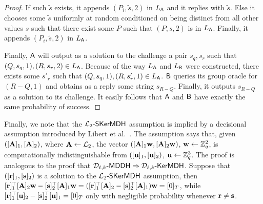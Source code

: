 \begin{proof}
If such $\tilde{s}$ exists, it appends $(P_i, \tilde{s},2)$ in $L_{\mathsf{A}}$ and it replies with $\tilde{s}$.  Else it chooses some $\tilde{s}$ uniformly at random conditioned on being distinct from all other values $s$ such that there exist some $P$ such that $(P,s,2)$ is in $L_{\mathsf{A}}$. Finally, it appends  $(P_i, \tilde{s},2)$ in $L_{\mathsf{A}}$.  


Finally, $\mathsf{A}$ will output as a solution to the challenge a pair $s_q,s_r$ such that 
$(Q,s_q,1),(R,s_r,2) \in L_{\mathsf{A}}$. Because of the way $L_{\mathsf{A}}$ and $L_{\mathsf{B}}$ were constructed,  there exists some $s'_r$ such that $(Q,s_q,1),(R,s'_r,1) \in L_{\mathsf{A}}$. $\mathsf{B}$ queries its group oracle for $(R-Q,1)$ and obtains as a reply some string $s_{R-Q}$. Finally, it outputs $s_{R-Q}$ as a solution to its challenge. 
It easily follows that $\mathsf{A}$ and $\mathsf{B}$ have exactly the same probability of success.
\end{proof} 

Finally, we note that the $\mathcal{L}_{2}\mbox{-}\mathsf{SKerMDH}$ assumption is implied by a decisional assumption introduced by Libert et al.~\cite{EPRINT:LPJY15}. The assumption says that, given $([\mathbf{{A}}]_1,[\mathbf{{A}}]_2)$, where $\mathbf{{A}}\gets\mathcal{L}_2$, the vector $([\mathbf{{A}}]_1\mathbf{w},[\mathbf{{A}}]_2\mathbf{w})$, $\mathbf{w}\gets\mathbb{Z}_q^2$, is computationally indistinguishable from $([\mathbf{u}]_1,[\mathbf{u}]_2)$, $\mathbf{u}\gets\mathbb{Z}_q^3$. The proof is analogous to the proof that $\mathcal{D}_{\ell,k}\mbox{-}\mathsf{MDDH}\Rightarrow\mathcal{D}_{\ell,k}\mbox{-}\mathsf{KerMDH}$. Suppose that $([\mathbf{r}]_1,[\mathbf{s}]_2)$ is a solution to the $\mathcal{L}_2\mbox{-}\mathsf{SKerMDH}$ assumption, then $[\mathbf{r}]_1^\top[\mathbf{{A}}]_2\mathbf{w}-[\mathbf{s}]_2^\top[\mathbf{{A}}]_1\mathbf{w}=([\mathbf{r}]_1^\top[\mathbf{{A}}]_2-[\mathbf{s}]_2^\top[\mathbf{{A}}]_1)\mathbf{w}=[0]_T$, while $[\mathbf{r}]_1^\top[\mathbf{u}]_2-[\mathbf{s}]_2^\top[\mathbf{u}]_1=[0]_T$ only with negligible probability whenever $\mathbf{r}\neq\mathbf{s}$. 
